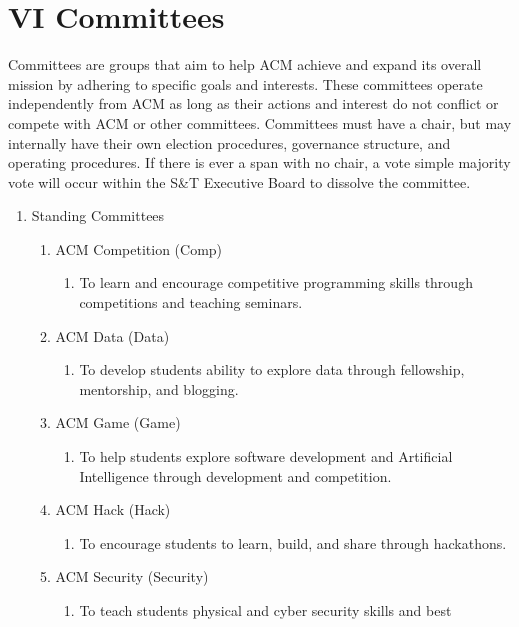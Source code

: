 
\section{VI \textendash{} Committees}
Committees are groups that aim to help ACM achieve and expand its overall mission
by adhering to specific goals and interests. These committees operate
independently from ACM as long as their actions and interest do not conflict or
compete with ACM or other committees. Committees must have a chair, but may
internally have their own election procedures, governance structure, and
operating procedures. If there is ever a span with no chair, a vote simple
majority vote will occur within the S\&T Executive Board to dissolve the
committee.
\begin{enumerate}[label=\Alph*.]
  \item Standing Committees
    \begin{enumerate}
      \item ACM Competition (Comp)
        \begin{enumerate}
          \item To learn and encourage competitive programming skills through
          competitions and teaching seminars.
        \end{enumerate}
      \item ACM Data (Data)
        \begin{enumerate}
          \item To develop students ability to explore data through fellowship,
            mentorship, and blogging.
        \end{enumerate}
      \item ACM Game (Game)
        \begin{enumerate}
          \item To help students explore software development and Artificial
            Intelligence through development and competition.
        \end{enumerate}
      \item ACM Hack (Hack)
        \begin{enumerate}
          \item To encourage students to learn, build, and share through
            hackathons.
        \end{enumerate}
      \item ACM Security (Security)
        \begin{enumerate}
          \item To teach students physical and cyber security skills and best

\end{enumerate}
\end{enumerate}
\end{enumerate}

